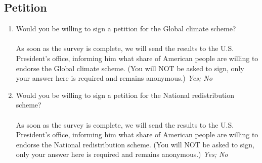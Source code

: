 \subsection*{Petition}
\begin{enumerate}[resume] \item Would you be willing to sign a petition for the Global climate scheme? \\
\\
As soon as the survey is complete, we will send the results to the U.S. President's office, informing him what share of American people are willing to endorse the Global climate scheme. (You will NOT be asked to sign, only your answer here is required and remains anonymous.) 
\textit{Yes; No}
\item Would you be willing to sign a petition for the National redistribution scheme? \\
\\
As soon as the survey is complete, we will send the results to the U.S. President's office, informing him what share of American people are willing to endorse the National redistribution scheme. (You will NOT be asked to sign, only your answer here is required and remains anonymous.) 
\textit{Yes; No}
\end{enumerate}

